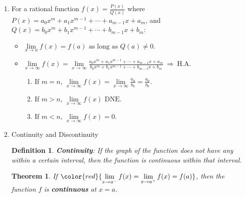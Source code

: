 \documentclass[12pt, a4paper]{article}
\newtheorem{theorem}{Theorem}[subsection]
\newtheorem{definition}{Definition}[subsection]
\begin{document}
\begin{enumerate}
\begin{itemize}
    \end{itemize}
    \item For a rational function $f(x)=\frac{P(x)}{Q(x)}$ where $P(x)=a_0x^m+a_1x^{m-1}+\cdots+a_{m-1}x+a_m$, and $Q(x)=b_0x^m+b_1x^{m-1}+\cdots+b_{m-1}x+b_m$:
    \begin{itemize}
        \item $\lim\limits_{x\rightarrow a}f(x)=f(a)\text{ as long as }Q(a)\neq 0.$
        \item $\lim\limits_{x\rightarrow \infty}f(x)=\lim\limits_{x\rightarrow \infty}\frac{a_0x^m+a_1x^{m-1}+\cdots+a_{m-1}x+a_m}{b_0x^m+b_1x^{m-1}+\cdots+b_{m-1}x+b_m}\ \Rightarrow\ \text{H.A.}$
        \begin{enumerate}
            \item If $m=n$, $\lim\limits_{x\rightarrow \infty}f(x)=\lim\limits_{x\rightarrow \infty}\frac{a_0}{b_0}=\frac{a_0}{b_0}.$
            \item If $m>n$, $\lim\limits_{x\rightarrow \infty}f(x)\text{ DNE.}$
            \item If $m<n$, $\lim\limits_{x\rightarrow \infty}f(x)=0.$
        \end{enumerate}
    \end{itemize}
    \item Continuity and Discontinuity
    \begin{definition}
        {\color{red}\textbf{Continuity}}: If the graph of the function does not have any {\color{red}{breaks or holes}} within a certain interval, then the function is continuous within that interval.
    \end{definition}
    \begin{theorem}
        If ${\color{red}{\lim\limits_{x\rightarrow a^-}f(x)=\lim\limits_{x\rightarrow a^+}f(x)=f(a)}}$, then the function $f$ is \textbf{continuous} at $x=a$.
    \end{theorem}
\end{enumerate}
\end{document}
